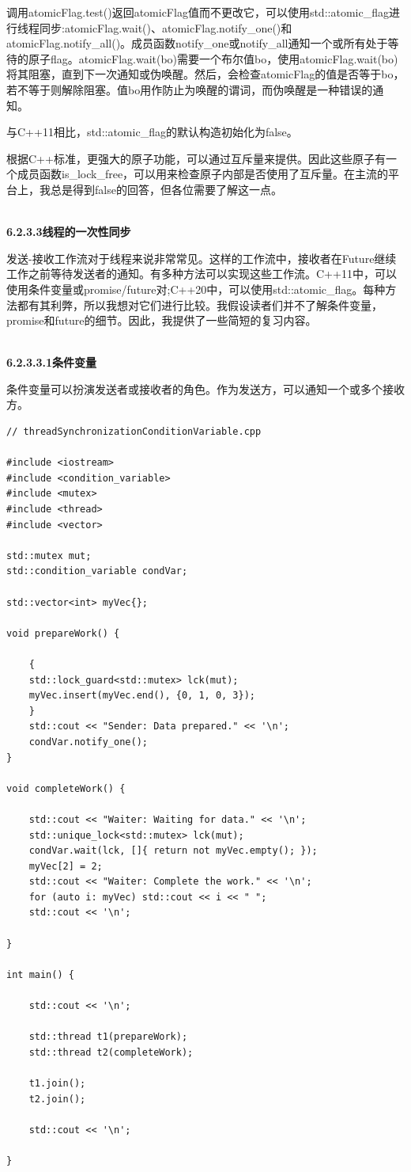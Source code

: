 调用atomicFlag.test()返回atomicFlag值而不更改它，可以使用std::atomic\_flag进行线程同步:atomicFlag.wait()、atomicFlag.notify\_one()和atomicFlag.notify\_all()。成员函数notify\_one或notify\_all通知一个或所有处于等待的原子flag。atomicFlag.wait(bo)需要一个布尔值bo，使用atomicFlag.wait(bo)将其阻塞，直到下一次通知或伪唤醒。然后，会检查atomicFlag的值是否等于bo，若不等于则解除阻塞。值bo用作防止为唤醒的谓词，而伪唤醒是一种错误的通知。

与C++11相比，std::atomic\_flag的默认构造初始化为false。

根据C++标准，更强大的原子功能，可以通过互斥量来提供。因此这些原子有一个成员函数is\_lock\_free，可以用来检查原子内部是否使用了互斥量。在主流的平台上，我总是得到false的回答，但各位需要了解这一点。


\hspace*{\fill} \\ %
\noindent
\textbf{6.2.3.3\hspace{0.2cm}线程的一次性同步}

发送-接收工作流对于线程来说非常常见。这样的工作流中，接收者在Future继续工作之前等待发送者的通知。有多种方法可以实现这些工作流。C++11中，可以使用条件变量或promise/future对;C++20中，可以使用std::atomic\_flag。每种方法都有其利弊，所以我想对它们进行比较。我假设读者们并不了解条件变量，promise和future的细节。因此，我提供了一些简短的复习内容。

\hspace*{\fill} \\ %
\noindent
\textbf{6.2.3.3.1\hspace{0.2cm}条件变量}

条件变量可以扮演发送者或接收者的角色。作为发送方，可以通知一个或多个接收方。

\begin{lstlisting}[style=styleCXX]
// threadSynchronizationConditionVariable.cpp

#include <iostream>
#include <condition_variable>
#include <mutex>
#include <thread>
#include <vector>

std::mutex mut;
std::condition_variable condVar;

std::vector<int> myVec{};

void prepareWork() {

	{
	std::lock_guard<std::mutex> lck(mut);
	myVec.insert(myVec.end(), {0, 1, 0, 3});
	}
	std::cout << "Sender: Data prepared." << '\n';
	condVar.notify_one();
}

void completeWork() {

	std::cout << "Waiter: Waiting for data." << '\n';
	std::unique_lock<std::mutex> lck(mut);
	condVar.wait(lck, []{ return not myVec.empty(); });
	myVec[2] = 2;
	std::cout << "Waiter: Complete the work." << '\n';
	for (auto i: myVec) std::cout << i << " ";
	std::cout << '\n';

}

int main() {

	std::cout << '\n';
	
	std::thread t1(prepareWork);
	std::thread t2(completeWork);
	
	t1.join();
	t2.join();
	
	std::cout << '\n';

}
\end{lstlisting}

